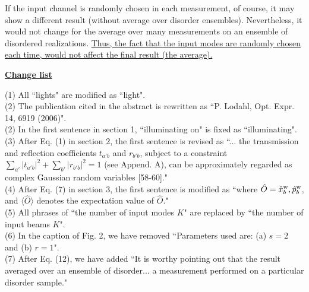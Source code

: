 \documentclass[10pt]{article}
\begin{document}
If the input channel is randomly chosen in each measurement, of course, it may show a different result (without average over disorder ensembles). Nevertheless, it would not change for the average over many measurements on an ensemble of disordered realizations. {\uline{Thus, the fact that the input modes are randomly chosen each time, would not affect the final result (the average).}}






\newpage

\begin{center}
{\uline{\bf{Change list}}}
\end{center}
(1) All ``lights" are modified as ``light".\\
(2) The publication cited in the abstract is rewritten as ``P. Lodahl, Opt. Expr. 14, 6919 (2006)".\\
(2) In the first sentence in section 1, ``illuminating on" is fixed as ``illuminating".\\
(3) After Eq. (1) in section 2, the first sentence is revised as ``... the transmission and reflection coefficients $t_{a'b}$ and $r_{b'b}$, subject to a constraint $\sum_{a'} |t_{a'b}|^2 + \sum_{b'} |r_{b'b}|^2 = 1$ (see Append. A), can be approximately regarded as complex Gaussian random variables [58-60]."\\
(4) After Eq. (7) in section 3, the first sentence is modified as ``where $\hat{O} = \hat{x}^{\rm{w}}_b, \hat{p}^{\rm{w}}_b$, and $\langle \hat{O} \rangle$ denotes the expectation value of $\hat{O}$."\\
(5) All phrases of ``the number of input modes $K$" are replaced by ``the number of input beams $K$".\\
(6) In the caption of Fig. 2, we have removed ``Parameters used are: (a) $s=2$ and (b) $r=1$".\\
(7) After Eq. (12), we have added ``It is worthy pointing out that the result averaged over an ensemble of disorder... a measurement performed on a particular disorder sample."\\
\end{document}
